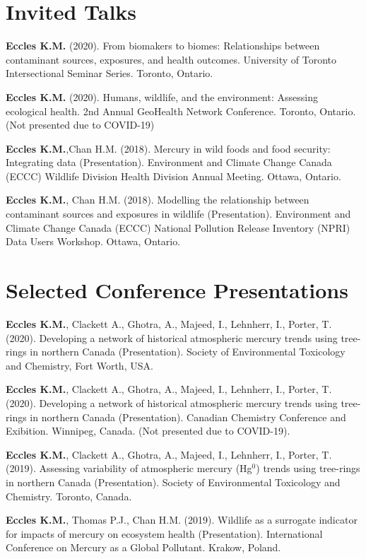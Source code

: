 \documentclass[margin,line]{res}
\begin{document}
\begin{resume}
\section{\sc Invited Talks}
\textbf{Eccles K.M. }(2020). From biomakers to biomes: Relationships between contaminant sources, exposures, and health outcomes. University of Toronto Intersectional Seminar Series. Toronto, Ontario.

\textbf{Eccles K.M. }(2020). Humans, wildlife, and the environment: Assessing ecological health. 2nd Annual GeoHealth Network Conference. Toronto, Ontario. (Not presented due to COVID-19)

\textbf{Eccles K.M.},Chan H.M. (2018). Mercury in wild foods and food security: Integrating data (Presentation). Environment and Climate Change Canada (ECCC) Wildlife Division Health Division Annual Meeting. Ottawa, Ontario.

\textbf{Eccles K.M.}, Chan H.M. (2018). Modelling the relationship between contaminant sources and exposures in wildlife (Presentation). Environment and Climate Change Canada (ECCC) National Pollution Release Inventory (NPRI) Data Users Workshop. Ottawa, Ontario.

\vspace*{.1in}

\section{\sc Selected Conference Presentations}

\textbf{Eccles K.M.}, Clackett A., Ghotra, A., Majeed, I., Lehnherr, I., Porter, T. (2020). Developing a network of historical atmospheric mercury trends using tree-rings in northern Canada (Presentation).  Society of Environmental Toxicology and Chemistry, Fort Worth, USA.

\textbf{Eccles K.M.}, Clackett A., Ghotra, A., Majeed, I., Lehnherr, I., Porter, T. (2020). Developing a network of historical atmospheric mercury trends using tree-rings in northern Canada (Presentation). Canadian Chemistry Conference and Exibition. Winnipeg, Canada. (Not presented due to COVID-19).

\textbf{Eccles K.M.}, Clackett A., Ghotra, A., Majeed, I., Lehnherr, I., Porter, T. (2019). Assessing variability of atmospheric mercury (Hg$^{0}$) trends using tree-rings in northern Canada (Presentation). Society of Environmental Toxicology and Chemistry. Toronto, Canada.

\textbf{Eccles K.M.}, Thomas P.J., Chan H.M. (2019). Wildlife as a surrogate indicator for impacts of mercury on ecosystem health (Presentation). International Conference on Mercury as a Global Pollutant. Krakow, Poland.


\end{resume}
\end{document}
